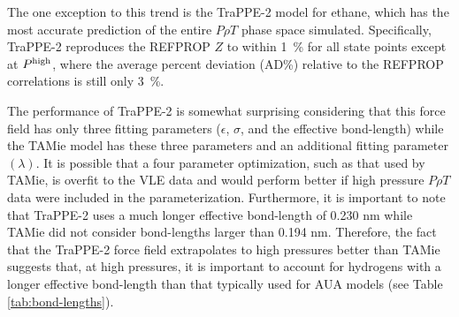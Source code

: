\documentclass[preprint,letterpaper,floatfix,citeautoscript,aip,jcp]{revtex4-1}
\begin{document}
The one exception to this trend is the TraPPE-2 model for ethane, which has the most accurate prediction of the entire $P \rho T$ phase space simulated. Specifically, TraPPE-2 reproduces the REFPROP $Z$ to within 1~\% for all state points except at $P^{\rm high}$, where the average percent deviation (AD\%) relative to the REFPROP correlations is still only 3~\%.


The performance of TraPPE-2 is somewhat surprising considering that this force field has only three fitting parameters ($\epsilon$, $\sigma$, and the effective bond-length) while the TAMie model has these three parameters and an additional fitting parameter $(\lambda)$. It is possible that a four parameter optimization, such as that used by TAMie, is overfit to the VLE data and would perform better if high pressure $P \rho T$ data were included in the parameterization. Furthermore, it is important to note that TraPPE-2 uses a much longer effective bond-length of 0.230 nm while TAMie did not consider bond-lengths larger than 0.194 nm. Therefore, the fact that the TraPPE-2 force field extrapolates to high pressures better than TAMie suggests that, at high pressures, it is important to account for hydrogens with a longer effective bond-length than that typically used for AUA models (see Table \ref{tab:bond-lengths}). 

\end{document}
